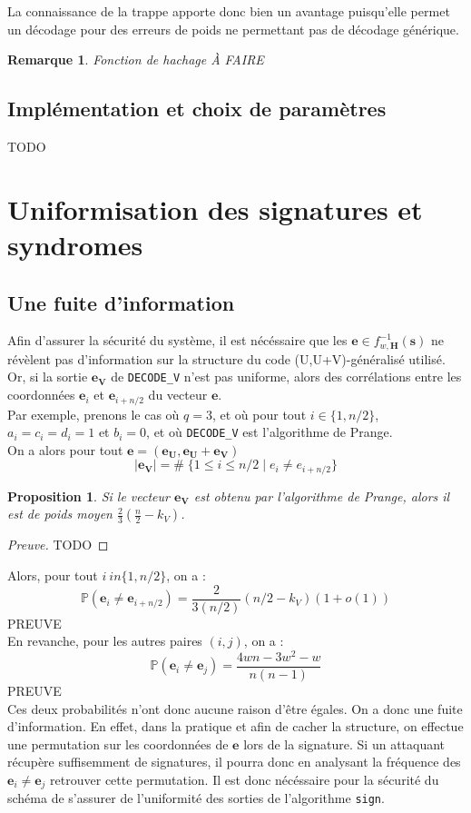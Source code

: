\documentclass[12pt]{article}
\theoremstyle{plain}
\newtheorem{remarque}[thm]{Remarque}
\newtheorem{propo}[thm]{Proposition}
\begin{document}
\noindent La connaissance de la trappe apporte donc bien un avantage puisqu'elle permet un décodage pour des erreurs de poids ne permettant pas de décodage générique. 

\begin{remarque} Fonction de hachage
À FAIRE
\end{remarque}

\subsection{Implémentation et choix de paramètres}
TODO \\
\section{Uniformisation des signatures et syndromes}

\subsection{Une fuite d'information}
Afin d'assurer la sécurité du système, il est nécéssaire que les $\mathbf{e} \in f_{w,\mathbf{H}}^{-1}(\mathbf{s})$ ne révèlent pas d'information sur la structure du code (U,U+V)-généralisé utilisé. \\
Or, si la sortie $\mathbf{e_V}$ de \verb|DECODE_V| n'est pas uniforme, alors des corrélations entre les coordonnées $\mathbf{e}_i$ et $\mathbf{e}_{i+n/2}$ du vecteur $\mathbf{e}$. \\
Par exemple, prenons le cas où $q=3$, et où pour tout $i \in \{1,n/2\}$, $a_i = c_i = d_i = 1$ et $b_i = 0$, et où \verb|DECODE_V| est l'algorithme de Prange. \\
On a alors pour tout $\mathbf{e} = (\mathbf{e_U},\mathbf{e_U}+\mathbf{e_V})$
$$ |\mathbf{e_V}| = \# \; \{1  \leq i \leq n/2 \;|\; e_i \neq e_{i+n/2}\}$$

\begin{propo}
Si le vecteur $\mathbf{e_V}$ est obtenu par l'algorithme de Prange, alors il est de poids moyen $\frac{2}{3}(\frac{n}{2}-k_V)$.
\end{propo}

\begin{proof}[Preuve]
TODO
\end{proof}

Alors, pour tout $i \ in \{1,n/2\}$, on a :
$$ \mathbb{P}(\mathbf{e}_i \neq \mathbf{e}_{i+n/2}) = \frac{2}{3(n/2)}(n/2-k_V)(1+o(1))$$
PREUVE \\
En revanche, pour les autres paires $(i,j)$, on a :
$$ \mathbb{P}(\mathbf{e}_i \neq \mathbf{e}_{j}) = \frac{4wn - 3w^2-w}{n(n-1)}$$
PREUVE \\
Ces deux probabilités n'ont donc aucune raison d'être égales. On a donc une fuite d'information. En effet, dans la pratique et afin de cacher la structure, on effectue une permutation sur les coordonnées de $\mathbf{e}$ lors de la signature. Si un attaquant récupère suffisemment de signatures, il pourra donc en analysant la fréquence des $\mathbf{e}_i \neq \mathbf{e}_j$ retrouver cette permutation. Il est donc nécéssaire pour la sécurité du schéma de s'assurer de l'uniformité des sorties de l'algorithme \verb|sign|.
\end{document}

